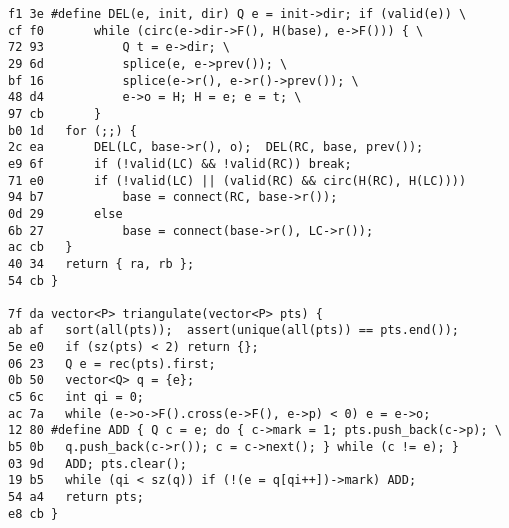 \documentclass[11pt, a4paper, twoside]{article}
\begin{document}
\begin{lstlisting}
f1 3e #define DEL(e, init, dir) Q e = init->dir; if (valid(e)) \
cf f0 		while (circ(e->dir->F(), H(base), e->F())) { \
72 93 			Q t = e->dir; \
29 6d 			splice(e, e->prev()); \
bf 16 			splice(e->r(), e->r()->prev()); \
48 d4 			e->o = H; H = e; e = t; \
97 cb 		}
b0 1d 	for (;;) {
2c ea 		DEL(LC, base->r(), o);  DEL(RC, base, prev());
e9 6f 		if (!valid(LC) && !valid(RC)) break;
71 e0 		if (!valid(LC) || (valid(RC) && circ(H(RC), H(LC))))
94 b7 			base = connect(RC, base->r());
0d 29 		else
6b 27 			base = connect(base->r(), LC->r());
ac cb 	}
40 34 	return { ra, rb };
54 cb }

7f da vector<P> triangulate(vector<P> pts) {
ab af 	sort(all(pts));  assert(unique(all(pts)) == pts.end());
5e e0 	if (sz(pts) < 2) return {};
06 23 	Q e = rec(pts).first;
0b 50 	vector<Q> q = {e};
c5 6c 	int qi = 0;
ac 7a 	while (e->o->F().cross(e->F(), e->p) < 0) e = e->o;
12 80 #define ADD { Q c = e; do { c->mark = 1; pts.push_back(c->p); \
b5 0b 	q.push_back(c->r()); c = c->next(); } while (c != e); }
03 9d 	ADD; pts.clear();
19 b5 	while (qi < sz(q)) if (!(e = q[qi++])->mark) ADD;
54 a4 	return pts;
e8 cb }
\end{lstlisting}
\end{document}
